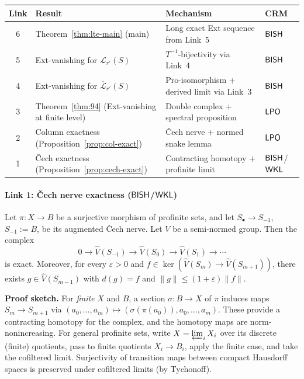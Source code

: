 \begin{center}
\small
\begin{tabular}{clll}
\toprule
\textbf{Link} & \textbf{Result} & \textbf{Mechanism} & \textbf{CRM} \\
\midrule
6 & Theorem~\ref{thm:lte-main} (main) &
  Long exact Ext sequence from Link~5 & $\textsf{BISH}$ \\
5 & Ext-vanishing for $\mathcal{L}_{r'}(S)$ &
  $T^{-1}$-bijectivity via Link~4 & $\textsf{BISH}$ \\
4 & Ext-vanishing for $\overline{\mathcal{L}}_{r'}(S)$ &
  Pro-isomorphism + derived limit via Link~3 & $\textsf{BISH}$ \\
3 & Theorem~\ref{thm:94} (Ext-vanishing at finite level) &
  Double complex + spectral proposition & $\textsf{LPO}$ \\
2 & Column exactness (Proposition~\ref{prop:col-exact}) &
  \v{C}ech nerve + normed snake lemma & $\textsf{LPO}$ \\
1 & \v{C}ech exactness (Proposition~\ref{prop:cech-exact}) &
  Contracting homotopy + profinite limit & $\textsf{BISH}$/$\textsf{WKL}$ \\
\bottomrule
\end{tabular}
\end{center}

\paragraph{Link 1: \v{C}ech nerve exactness ($\textsf{BISH}$/$\textsf{WKL}$)}

\begin{proposition}
\label{prop:cech-exact}
Let $\pi: X \to B$ be a surjective morphism of profinite sets,
and let $S_\bullet \to S_{-1}$, $S_{-1} := B$, be its augmented
\v{C}ech nerve.  Let $V$ be a semi-normed group.  Then the complex
\[
  0 \longrightarrow \widehat{V}(S_{-1}) \longrightarrow
  \widehat{V}(S_0) \longrightarrow
  \widehat{V}(S_1) \longrightarrow \cdots
\]
is exact.  Moreover, for every $\varepsilon > 0$ and
$f \in \ker(\widehat{V}(S_m) \to \widehat{V}(S_{m+1}))$,
there exists $g \in \widehat{V}(S_{m-1})$ with $d(g) = f$
and $\|g\| \leq (1 + \varepsilon)\|f\|$.
\end{proposition}

\noindent\textbf{Proof sketch.}
For \emph{finite} $X$ and $B$, a section $\sigma: B \to X$ of $\pi$
induces maps $S_m \to S_{m+1}$ via
$(a_0, \ldots, a_m) \mapsto (\sigma(\pi(a_0)), a_0, \ldots, a_m)$.
These provide a contracting homotopy for the complex, and the homotopy
maps are norm-nonincreasing.  For general profinite sets, write
$X = \varprojlim_i X_i$ over its discrete (finite) quotients,
pass to finite quotients $X_i \to B_i$, apply the finite case, and
take the cofiltered limit.  Surjectivity of transition maps between
compact Hausdorff spaces is preserved under cofiltered limits
(by Tychonoff).

